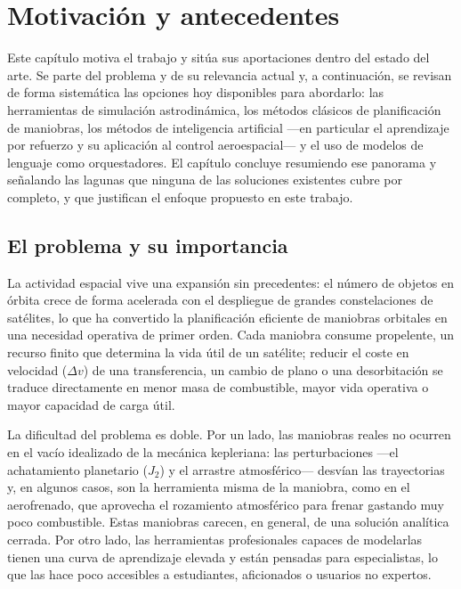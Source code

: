 \chapter{Motivación y antecedentes}
\label{ch:antecedentes}

Este capítulo motiva el trabajo y sitúa sus aportaciones dentro del estado del arte. Se parte del problema y de su relevancia actual y, a continuación, se revisan de forma sistemática las opciones hoy disponibles para abordarlo: las herramientas de simulación astrodinámica, los métodos clásicos de planificación de maniobras, los métodos de inteligencia artificial ---en particular el aprendizaje por refuerzo y su aplicación al control aeroespacial--- y el uso de modelos de lenguaje como orquestadores. El capítulo concluye resumiendo ese panorama y señalando las lagunas que ninguna de las soluciones existentes cubre por completo, y que justifican el enfoque propuesto en este trabajo.

\section{El problema y su importancia}

La actividad espacial vive una expansión sin precedentes: el número de objetos en órbita crece de forma acelerada con el despliegue de grandes constelaciones de satélites, lo que ha convertido la planificación eficiente de maniobras orbitales en una necesidad operativa de primer orden. Cada maniobra consume propelente, un recurso finito que determina la vida útil de un satélite; reducir el coste en velocidad ($\Delta v$) de una transferencia, un cambio de plano o una desorbitación se traduce directamente en menor masa de combustible, mayor vida operativa o mayor capacidad de carga útil.

La dificultad del problema es doble. Por un lado, las maniobras reales no ocurren en el vacío idealizado de la mecánica kepleriana: las perturbaciones ---el achatamiento planetario ($J_2$) y el arrastre atmosférico--- desvían las trayectorias y, en algunos casos, son la herramienta misma de la maniobra, como en el aerofrenado, que aprovecha el rozamiento atmosférico para frenar gastando muy poco combustible. Estas maniobras carecen, en general, de una solución analítica cerrada. Por otro lado, las herramientas profesionales capaces de modelarlas tienen una curva de aprendizaje elevada y están pensadas para especialistas, lo que las hace poco accesibles a estudiantes, aficionados o usuarios no expertos.

